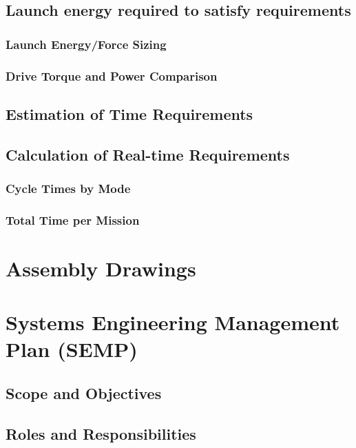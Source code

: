 \documentclass[a4paper,10pt]{article}
\begin{document}
\subsection{Launch energy required to satisfy requirements}

\subsubsection{Launch Energy/Force Sizing}

\subsubsection{Drive Torque and Power Comparison}

\subsection{Estimation of Time Requirements}

\subsection{Calculation of Real-time Requirements}

\subsubsection{Cycle Times by Mode}

\subsubsection{Total Time per Mission}

\newpage

\section{Assembly Drawings}

\newpage

\section{Systems Engineering Management Plan (SEMP)}

\subsection{Scope and Objectives}

\subsection{Roles and Responsibilities}
\end{document}
